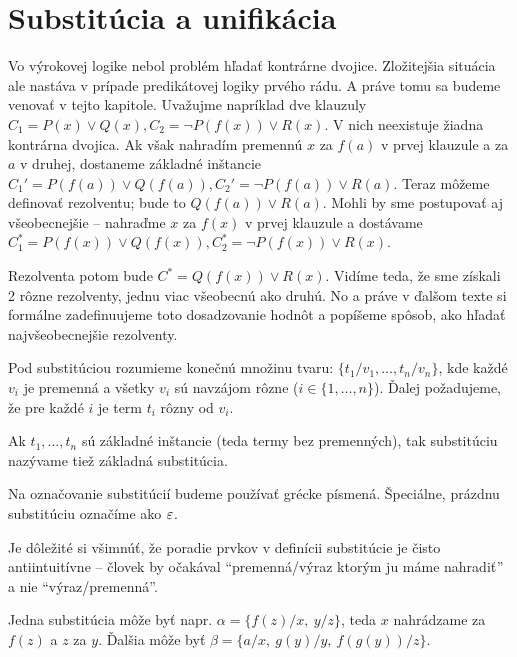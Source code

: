 \section{Substitúcia a unifikácia}

Vo výrokovej logike nebol problém hľadať kontrárne dvojice.
Zložitejšia situácia ale nastáva v prípade predikátovej logiky
prvého rádu. A práve tomu sa budeme venovať v tejto kapitole.
Uvažujme napríklad dve klauzuly
$C_1=P(x) \lor Q(x), C_2 = \neg P(f(x)) \lor R(x)$.
V nich neexistuje žiadna kontrárna dvojica. Ak však nahradím premennú
$x$ za $f(a)$ v prvej klauzule a za $a$ v druhej,
dostaneme základné inštancie
$C_1'=P(f(a)) \lor Q(f(a)), C_2'=\neg P(f(a)) \lor R(a)$.
Teraz môžeme definovať rezolventu; bude to $Q(f(a)) \lor R(a)$.
Mohli by sme postupovať aj všeobecnejšie -- nahraďme $x$ za $f(x)$ v
prvej klauzule a dostávame
$ C_1^*= P(f(x)) \lor Q(f(x)), C_2^*= \neg P(f(x)) \lor R(x)$.

Rezolventa potom bude $C^*= Q(f(x)) \lor R(x)$.
Vidíme teda, že sme získali 2 rôzne rezolventy, jednu viac všeobecnú
ako druhú. No a práve v ďalšom texte si formálne zadefinuujeme toto
dosadzovanie hodnôt a popíšeme spôsob, ako hľadať najvšeobecnejšie
rezolventy.

\begin{definicia}[Substitúcia]
    Pod substitúciou rozumieme konečnú množinu tvaru:
    $\{t_1/v_1, \ldots, t_n/v_n\}$, kde každé $v_i$ je premenná a všetky
    $v_i$ sú navzájom rôzne ($i \in\{1,\dots,n\}$).
    Ďalej požadujeme, že pre každé $i$ je term  $t_i$ rôzny od $v_i$.

    Ak $t_1, \ldots, t_n$ sú základné inštancie (teda termy bez premenných),
    tak substitúciu nazývame tiež základná substitúcia.
\end{definicia}

\begin{poznamka}
    Na označovanie substitúcií budeme používať grécke písmená.
    Špeciálne, prázdnu substitúciu označíme ako $\varepsilon$.
\end{poznamka}

\begin{poznamka}
    Je dôležité si všimnúť, že poradie prvkov v definícii substitúcie je
    čisto antiintuitívne -- človek by očakával ``premenná/výraz ktorým ju
    máme nahradiť'' a nie ``výraz/premenná''.
\end{poznamka}

\begin{priklad}
    Jedna substitúcia môže byť napr.
    $\alpha = \{ f(z)/x,\ y/z\}$, teda $x$ nahrádzame za $f(z)$ a
    $z$ za $y$.
    Ďalšia môže byť $\beta = \{ a/x,\ g(y)/y,\ f(g(y))/z\}$.
\end{priklad}

